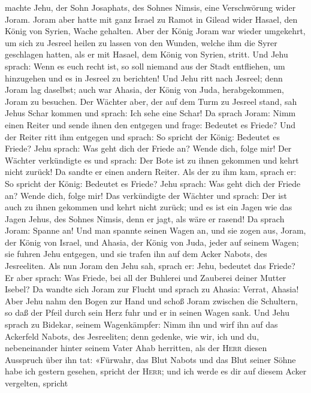 machte Jehu, der Sohn Josaphats, des Sohnes Nimsis, eine Verschwörung
wider Joram. Joram aber hatte mit ganz Israel zu Ramot in Gilead wider
Hasael, den König von Syrien, Wache gehalten.  Aber der
König Joram war wieder umgekehrt, um sich zu Jesreel heilen zu lassen
von den Wunden, welche ihm die Syrer geschlagen hatten, als er mit
Hasael, dem König von Syrien, stritt. Und Jehu sprach: Wenn es euch
recht ist, so soll niemand aus der Stadt entfliehen, um hinzugehen und
es in Jesreel zu berichten!  Und Jehu ritt nach Jesreel;
denn Joram lag daselbst; auch war Ahasia, der König von Juda,
herabgekommen, Joram zu besuchen.  Der Wächter aber, der
auf dem Turm zu Jesreel stand, sah Jehus Schar kommen und sprach: Ich
sehe eine Schar! Da sprach Joram: Nimm einen Reiter und sende ihnen den
entgegen und frage: Bedeutet es Friede?  Und der Reiter
ritt ihm entgegen und sprach: So spricht der König: Bedeutet es Friede?
Jehu sprach: Was geht dich der Friede an? Wende dich, folge mir! Der
Wächter verkündigte es und sprach: Der Bote ist zu ihnen gekommen und
kehrt nicht zurück!  Da sandte er einen andern Reiter.
Als der zu ihm kam, sprach er: So spricht der König: Bedeutet es Friede?
Jehu sprach: Was geht dich der Friede an? Wende dich, folge mir!
 Das verkündigte der Wächter und sprach: Der ist auch zu
ihnen gekommen und kehrt nicht zurück; und es ist ein Jagen wie das
Jagen Jehus, des Sohnes Nimsis, denn er jagt, als wäre er rasend!
 Da sprach Joram: Spanne an! Und man spannte seinen Wagen
an, und sie zogen aus, Joram, der König von Israel, und Ahasia, der
König von Juda, jeder auf seinem Wagen; sie fuhren Jehu entgegen, und
sie trafen ihn auf dem Acker Nabots, des Jesreeliten. 
Als nun Joram den Jehu sah, sprach er: Jehu, bedeutet das Friede? Er
aber sprach: Was Friede, bei all der Buhlerei und Zauberei deiner Mutter
Isebel?  Da wandte sich Joram zur Flucht und sprach zu
Ahasia: Verrat, Ahasia!  Aber Jehu nahm den Bogen zur
Hand und schoß Joram zwischen die Schultern, so daß der Pfeil durch sein
Herz fuhr und er in seinen Wagen sank.  Und Jehu sprach
zu Bidekar, seinem Wagenkämpfer: Nimm ihn und wirf ihn auf das Ackerfeld
Nabots, des Jesreeliten; denn gedenke, wie wir, ich und du,
nebeneinander hinter seinem Vater Ahab herritten, als der \textsc{Herr}
diesen Ausspruch über ihn tat:  «Fürwahr, das Blut Nabots
und das Blut seiner Söhne habe ich gestern gesehen, spricht der
\textsc{Herr}; und ich werde es dir auf diesem Acker vergelten, spricht
